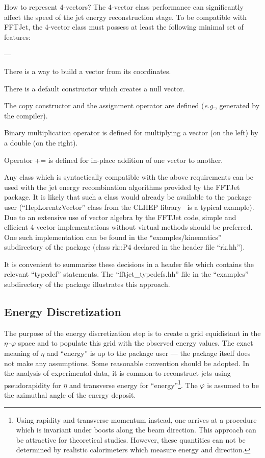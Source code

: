 \documentclass[epsf,12pt,titlepage]{article}
\def\epspace {$\eta$\,-$\varphi$ space }
\newcommand{\cname}[1]{\index{#1}\textsf{#1}}
\newenvironment{thinlist} {
    \begin{list} {---} {
        \setlength{\topsep}{0.075cm}
        \setlength{\parsep}{0.075cm}
        \setlength{\itemsep}{0.075cm}
    }
} {\end{list}}
\begin{document}
\begin{itemize}
\item How to represent 4-vectors? The 4-vector class
      performance can significantly affect the speed of the
      jet energy reconstruction stage. To be compatible with
      FFTJet, the 4-vector class must possess at least the following minimal
      set of features:
      \begin{thinlist}
        \item There is a way to build a vector from its coordinates.
        \item There is a default constructor which creates a null vector.
        \item The copy constructor and the assignment operator are defined
              ({\it e.g.}, generated by the compiler).
        \item Binary multiplication operator is defined for multiplying
              a vector (on the left) by a double (on the right).
        \item Operator += is defined for in-place addition of one vector to another.
      \end{thinlist}
      Any class which is syntactically compatible with the above
      requirements can be used with the jet energy recombination
      algorithms provided by the FFTJet package. It is likely that
      such a class would already be available to the package user
      (``HepLorentzVector'' class from the CLHEP
      library~\cite{ref:clhep} is a typical example).
      Due to an extensive use of vector algebra by the FFTJet code, simple
      and efficient 4-vector implementations without virtual methods
      should be preferred. One such implementation can be found in the
      ``examples/kinematics'' subdirectory of the package
      (class \cname{rk::P4} declared in the header file ``rk.hh'').
\end{itemize}
It is convenient to summarize these decisions in a header file which
contains the relevant ``typedef'' statements. The ``fftjet\_typedefs.hh''
file in the ``examples'' subdirectory of the package illustrates this approach.


\subsection{Energy Discretization}
\label{sec:discretization}

The purpose of the energy discretization step
is to create a grid equidistant in the \epspace
and to populate this grid with the observed energy
values. The exact meaning of $\eta$ and ``energy'' is
up to the package user ---  the package itself does
not make any assumptions. Some reasonable convention should
be adopted. In the analysis of experimental data,
it is common to reconstruct jets using pseudorapidity
for $\eta$ and transverse energy for
``energy''\footnote{Using rapidity and transverse momentum instead, one arrives
at a procedure which is invariant under boosts along the beam direction.
This approach can be attractive for theoretical studies.
However, these quantities can not be determined
by realistic calorimeters which measure  energy and direction.}.
The $\varphi$ is assumed to be the azimuthal angle of
the energy deposit.
\end{document}
